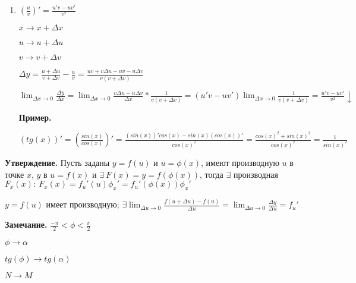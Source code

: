 \documentclass{article}
\begin{document}
\begin{enumerate}
        \item \( (\frac{u}{v})' = \frac{u'v - uv'}{v^2}  \)
        
            \( x \to x + \Delta x \)
            
            \( u \to u + \Delta u \)

            \( v \to v + \Delta v \)

            \( \Delta y = \frac{u + \Delta u}{v + \Delta v} - \frac{u}{v} = \frac{uv + v\Delta u - uv - u\Delta v}{v(v + \Delta v)} \)
            
            \(\lim_{\Delta x \to 0}{\frac{\Delta y}{\Delta x}} = \lim_{\Delta x \to 0}{\frac{v\Delta u - u\Delta v}{\Delta x}*\frac{1}{v(v+\Delta v)}} = (u'v - uv')\lim_{\Delta x \to 0}{\frac{1}{v(v+\Delta v)}} = \frac{u'v - uv'}{v^2}\downarrow\)
        
            \textbf{Пример.}
            
            \( (tg(x))' = (\frac{sin(x)}{cos(x)})' = \frac{(sin(x))'cos(x) - sin(x)(cos(x))'}{cos(x)^2} = \frac{cos(x)^2 + sin(x)^2}{cos(x)^2} = \frac{1}{sin(x)^2} \)
    \end{enumerate}
    
    \textbf{Утверждение.} Пусть заданы \( y = f(u) \) и \( u = \phi(x) \), имеют производную \(u\) в точке \(x\), \(y\) в \(u = f(x)\) и \( \exists\ F(x) = y = f(\phi(x)) \), тогда \(\exists\) производная \(F_x(x):\ F_x(x) = f_u'(u)\phi_x' = f_u'(\phi(x))\phi_x' \)
    
    \(y = f(u)\) имеет производную; \(\exists \lim_{\Delta u \to 0}{\frac{f(u+\Delta u) - f(u)}{\Delta u}} = \lim_{\Delta u \to 0}{\frac{\Delta y}{\Delta u}} = f_u'\)

    \textbf{Замечание.}
    \( \frac{-\pi}{2} < \phi < \frac{\pi}{2} \)

    \( \phi \to \alpha \)

    \( tg(\phi) \to tg(\alpha) \)

    \( N \to M \)
\end{document}
